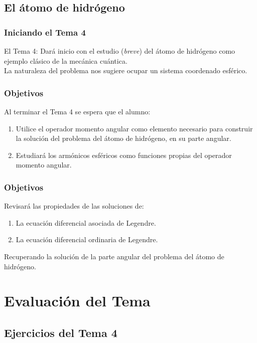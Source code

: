 \documentclass[12pt]{beamer}
\begin{document}
\subsection{El átomo de hidrógeno}

\begin{frame}
\frametitle{Iniciando el Tema 4}
El Tema 4: Dará inicio con el estudio (\emph{breve}) del átomo de hidrógeno como ejemplo clásico de la mecánica cuántica.
\\
\bigskip
\pause
La naturaleza del problema nos sugiere ocupar un sistema coordenado esférico.
\end{frame}
\begin{frame}
\frametitle{Objetivos}
Al terminar el Tema 4 se espera que el alumno:
\begin{enumerate}[<+->]
\item Utilice el operador momento angular como elemento necesario para construir la solución del problema del átomo de hidrógeno, en su parte angular.
\item Estudiará los armónicos esféricos como funciones propias del operador momento angular.
\seti
\end{enumerate}
\end{frame}
\begin{frame}
\frametitle{Objetivos}
Revisará las propiedades de las soluciones de:
\begin{enumerate}[<+->]
\conti
\item La ecuación diferencial asociada de Legendre.
\item La ecuación diferencial ordinaria de Legendre.
\end{enumerate}
\pause
Recuperando la solución de la parte angular del problema del átomo de hidrógeno.
\end{frame}

\section{Evaluación del Tema}
\subsection{Ejercicios del Tema 4}
\end{document}
